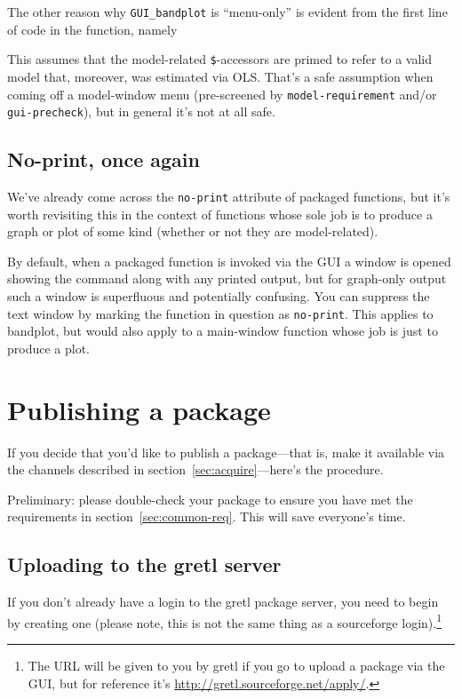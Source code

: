 \documentclass[oneside]{book}
\begin{document}
The other reason why \texttt{GUI\_bandplot} is ``menu-only'' is
evident from the first line of code in the function, namely
%
This assumes that the model-related \texttt{\$}-accessors are primed
to refer to a valid model that, moreover, was estimated via
OLS. That's a safe assumption when coming off a model-window menu
(pre-screened by \texttt{model-requirement} and/or
\texttt{gui-precheck}), but in general it's not at all safe.

\subsection{No-print, once again}

We've already come across the \texttt{no-print} attribute of packaged
functions, but it's worth revisiting this in the context of functions
whose sole job is to produce a graph or plot of some kind (whether or
not they are model-related).

By default, when a packaged function is invoked via the GUI a window
is opened showing the command along with any printed output, but for
graph-only output such a window is superfluous and potentially
confusing.  You can suppress the text window by marking the function
in question as \texttt{no-print}. This applies to bandplot, but
would also apply to a main-window function whose job is just to
produce a plot.

\section{Publishing a package}
\label{sec:publish}

If you decide that you'd like to publish a package---that is, make it
available via the channels described in
section~\ref{sec:acquire}---here's the procedure.

Preliminary: please double-check your package to ensure you have met
the requirements in section~\ref{sec:common-req}. This will save
everyone's time.

\subsection{Uploading to the gretl server}

If you don't already have a login to the gretl package server, you
need to begin by creating one (please note, this is not the same thing
as a sourceforge login).\footnote{The URL will be given to you by
  gretl if you go to upload a package via the GUI, but for reference
  it's \url{http://gretl.sourceforge.net/apply/}.}
\end{document}
